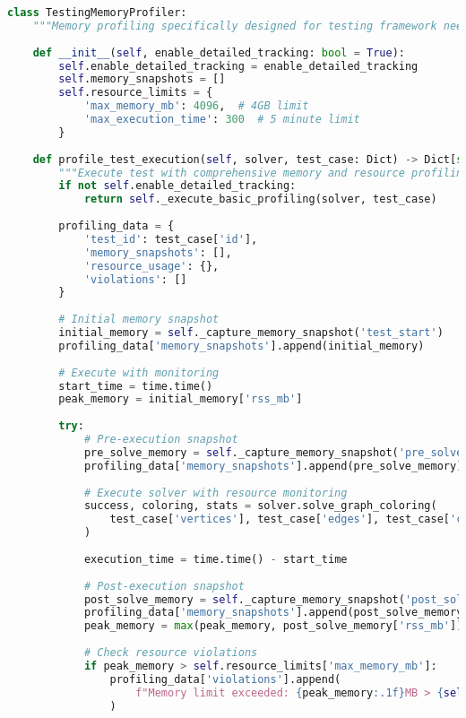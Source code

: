 \begin{lstlisting}[language=Python, caption=Memory Profiling and Resource Monitoring for Testing]
class TestingMemoryProfiler:
    """Memory profiling specifically designed for testing framework needs"""
    
    def __init__(self, enable_detailed_tracking: bool = True):
        self.enable_detailed_tracking = enable_detailed_tracking
        self.memory_snapshots = []
        self.resource_limits = {
            'max_memory_mb': 4096,  # 4GB limit
            'max_execution_time': 300  # 5 minute limit
        }
    
    def profile_test_execution(self, solver, test_case: Dict) -> Dict[str, Any]:
        """Execute test with comprehensive memory and resource profiling"""
        if not self.enable_detailed_tracking:
            return self._execute_basic_profiling(solver, test_case)
        
        profiling_data = {
            'test_id': test_case['id'],
            'memory_snapshots': [],
            'resource_usage': {},
            'violations': []
        }
        
        # Initial memory snapshot
        initial_memory = self._capture_memory_snapshot('test_start')
        profiling_data['memory_snapshots'].append(initial_memory)
        
        # Execute with monitoring
        start_time = time.time()
        peak_memory = initial_memory['rss_mb']
        
        try:
            # Pre-execution snapshot
            pre_solve_memory = self._capture_memory_snapshot('pre_solve')
            profiling_data['memory_snapshots'].append(pre_solve_memory)
            
            # Execute solver with resource monitoring
            success, coloring, stats = solver.solve_graph_coloring(
                test_case['vertices'], test_case['edges'], test_case['colors']
            )
            
            execution_time = time.time() - start_time
            
            # Post-execution snapshot
            post_solve_memory = self._capture_memory_snapshot('post_solve')
            profiling_data['memory_snapshots'].append(post_solve_memory)
            peak_memory = max(peak_memory, post_solve_memory['rss_mb'])
            
            # Check resource violations
            if peak_memory > self.resource_limits['max_memory_mb']:
                profiling_data['violations'].append(
                    f"Memory limit exceeded: {peak_memory:.1f}MB > {self.resource_limits['max_memory_mb']}MB"
                )
            

\end{lstlisting}
